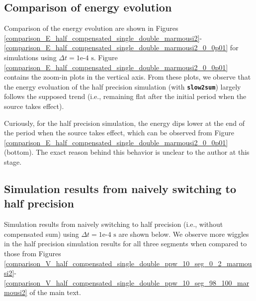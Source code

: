 \subsection{Comparison of energy evolution}\label{SM_2D_energy}
%
Comparison of the energy evolution are shown in Figures \ref{comparison_E_half_compensated_single_double_marmousi2}-\ref{comparison_E_half_compensated_single_double_marmousi2_0_0p01} for simulations using $\Delta t = \text{1e-4~s}$.
%
Figure \ref{comparison_E_half_compensated_single_double_marmousi2_0_0p01} contains the zoom-in plots in the vertical axis. 
%
From these plots, we observe that the energy evoluation of the half precision simulation (with \textbf{\texttt{\small slow2sum}}) largely follows the supposed trend (i.e., remaining flat after the initial period when the source takes effect). 


Curiously, for the half precision simulation, the energy dips lower at the end of the period when the source takes effect, which can be observed 
from Figure \ref{comparison_E_half_compensated_single_double_marmousi2_0_0p01} (bottom).
%
The exact reason behind this behavior is unclear to the author at this stage.




\subsection{Simulation results from naively switching to half precision}\label{SM_2D_naive}
%
Simulation results from naively switching to half precision (i.e., without compensated sum) using $\Delta t = \text{1e-4~s}$ are shown below. We observe more wiggles in the half precision simulation results for all three segments when compared to those from Figures \ref{comparison_V_half_compensated_single_double_ppw_10_seg_0_2_marmousi2}-\ref{comparison_V_half_compensated_single_double_ppw_10_seg_98_100_marmousi2} of the main text.


